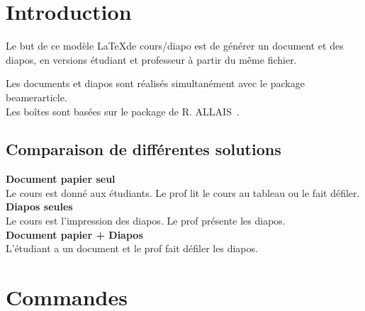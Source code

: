 \documentclass[b,e,cours]{D:/Dropbox/enseignement/CPGE/raphaelpoiree/paquets/classe_kara}
\begin{document}
\newcommand*{\partie}{Modèles}
\newcommand*{\titre}{Modèle de cours}
\newcommand*{\numero}{-1}
\newcommand*{\prerequis}{\item Prérequis}
\newcommand*{\connaissances}{\item connaissance}
\newcommand*{\savoirfaire}{\item savoirfaire}
\newcommand*{\organisation}{\item Organisation}
\newcommand*{\afaire}{\item gérer les références.}





\section{Introduction}
\begin{frame}
Le but de ce modèle \LaTeX de cours/diapo est de générer un document et des diapos, en versions étudiant et professeur à partir du même fichier.
\end{frame}
\begin{frame}
Les documents et diapos sont réalisés simultanément avec le package beamerarticle.\\
Les boîtes sont basées sur le package de R. ALLAIS~\cite{raphaelallais}.
\end{frame}

\subsection{Comparaison de différentes solutions}
\begin{frame}
\textbf{Document papier seul}~~\\
Le cours est donné aux étudiants. Le prof lit le cours au tableau ou le fait défiler.\\
\textbf{Diapos seules}~~\\
Le cours est l'impression des diapos. Le prof présente les diapos.\\
\textbf{Document papier + Diapos}\\
L'étudiant a un document et le prof fait défiler les diapos.
\end{frame}


\section{Commandes}
\end{document}
